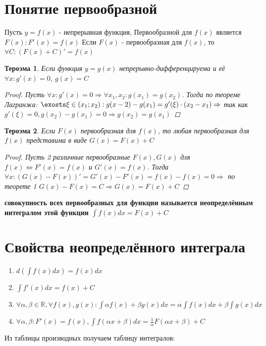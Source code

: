 \documentclass[oneside]{book}
\newtheorem{thm}{Тероэма}[chapter] %
\begin{document}
\begin{itemize}
\begin{enumerate}
\section[Первообразная]{Понятие первообразной}
Пусть $y = f(x)$ - непрерывная функция, Первообразной для $f(x)$ является $F(x): F'(x) = f(x)$
Если $F(x)$ - первообразная для $f(x)$, то $\forall C: (F(x) + C)' = f(x)$
\begin{thm}
  Если функция $y = g(x)$ непрерывно-дифференцируема и её $\forall x: g'(x) = 0$, $g(x) = C$
  \begin{proof}
    Пусть $\forall x: g'(x) = 0 \Rightarrow \forall x_1, x_2: g(x_1) = g(x_2)$. Тогда по теореме Лагранжа:
    $\exosts \xi \in (x_1; x_2): g(x-2) - g(x_1) = g'(\xi)\cdot(x_2 - x_1) \Rightarrow$ так как $g'(\xi) = 0, g(x_2) - g(x_1) = 0 \Rightarrow g(x_2) = g(x_1)$
  \end{proof}
\end{thm}
\begin{thm}
  Если $F(x)$ первообразная для $f(x)$, то любая первообразная для $f(x)$ представима в виде $G(x) = F(x) + C$
  \begin{proof}
    Пусть 2 различные первообразные $F(x), G(x)$ для $f(x) \Leftrightarrow F'(x) = f(x) $ и $G'(x) = f(x)$.
    Тогда $\forall x: (G(x) - F(x))' = G'(x) - F'(x) = f(x) - f(x) = 0 \Rightarrow$ по теорете 1 $G(x) - F(x) = C \Rightarrow G(x) = F(x) + C$
  \end{proof}
\end{thm}
\textbf{совокупность всех первообразных для функции называется неопределённым интегралом этой функции $\int f(x) dx = F(x) + C$}
\section[Свойства]{Свойства неопределённого интеграла}
\begin{enumerate}
  \item $d(\int f(x) dx) = f(x) dx$
  \item $\int f'(x) dx = f(x) + C$
  \item $\forall \alpha, \beta \in \mathbb{R}, \forall f(x), g(x): \int \alpha f(x) + \beta g(x) dx = \alpha \int f(x) dx + \beta \int g(x) dx$
  \item $\forall \alpha, \beta: F'(x) = f(x), \int f(\alpha x + \beta) dx = \frac{1}{\alpha}F(\alpha x+\beta)+C$
\end{enumerate}
Из таблицы производных получаем таблицу интегралов:


\end{enumerate}
\end{itemize}
\end{document}
